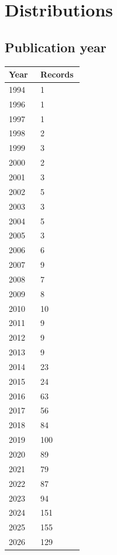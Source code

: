\documentclass[10pt,a4paper]{article}
\begin{document}
\section*{Distributions}
\subsection*{Publication year}
{\scriptsize\begin{longtable}{p{0.402\linewidth}p{0.553\linewidth}}
\hline
\textbf{Year} & \textbf{Records} \\ \hline
\endhead
1994 & 1 \\
1996 & 1 \\
1997 & 1 \\
1998 & 2 \\
1999 & 3 \\
2000 & 2 \\
2001 & 3 \\
2002 & 5 \\
2003 & 3 \\
2004 & 5 \\
2005 & 3 \\
2006 & 6 \\
2007 & 9 \\
2008 & 7 \\
2009 & 8 \\
2010 & 10 \\
2011 & 9 \\
2012 & 9 \\
2013 & 9 \\
2014 & 23 \\
2015 & 24 \\
2016 & 63 \\
2017 & 56 \\
2018 & 84 \\
2019 & 100 \\
2020 & 89 \\
2021 & 79 \\
2022 & 87 \\
2023 & 94 \\
2024 & 151 \\
2025 & 155 \\
2026 & 129 \\
\hline
\end{longtable}}
\end{document}
